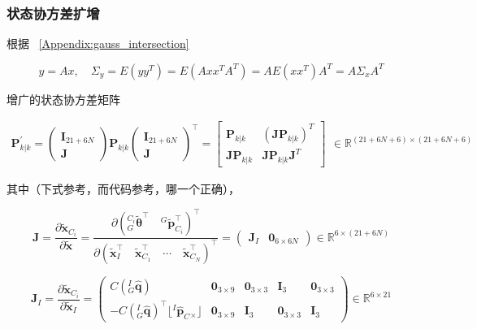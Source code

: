 \documentclass[12pt,a4paper]{article}
\begin{document}
\subsubsection{状态协方差扩增}

根据 ~\ref{Appendix:gauss_intersection}

$$
y = Ax, \quad {\Sigma}_y = E(yy^T) = E(Ax x^T A^T) = A E(xx^T) A^T = A {\Sigma}_x A^T
$$

增广的状态协方差矩阵

\begin{equation}
\begin{aligned}
\mathbf{P}_{k|k}^{\prime}
= 
\begin{pmatrix}
\mathbf{I}_{21+6N} \\ \mathbf{J}
\end{pmatrix}
\mathbf{P}_{k|k}
\begin{pmatrix}
\mathbf{I}_{21+6N} \\ \mathbf{J}
\end{pmatrix}^\top 
=
\begin{bmatrix}
\mathbf{P}_{k|k} & (\mathbf{J} \mathbf{P}_{k|k})^T \\
\mathbf{J} \mathbf{P}_{k|k} & \mathbf{J} \mathbf{P}_{k|k} \mathbf{J}^T
\end{bmatrix}
\end{aligned}
\in \mathbb{R}^{(21+6N+6) \times (21+6N+6)}
\end{equation}

其中（下式参考\citep{sun2018robust}，而代码参考\cite{mourikis2007multi}，{\color{red}哪一个正确}），

\begin{equation*}
\mathbf{J} = 
\frac{\partial{\tilde{\mathbf{x}}_{C_i}}}{\partial{\tilde{\mathbf{x}}}} = 
\frac{
\partial{\left(
{}^{C_i}_G\tilde{\boldsymbol{\theta}}^\top \quad
{}^G\tilde{\mathbf{p}}_{C_i}^\top
\right)^\top}}
{\partial{\left(
\tilde{\mathbf{x}}_I^\top \quad
\tilde{\mathbf{x}}_{C_1}^\top \quad
\cdots \quad 
\tilde{\mathbf{x}}_{C_N}^\top
\right)^\top}} = 
\begin{pmatrix}
\mathbf{J}_I & \mathbf{0}_{6\times 6N}
\end{pmatrix}
\in \mathbb{R}^{6 \times (21+6N)}
\end{equation*}

\begin{equation*}
\mathbf{J}_I = 
\frac{\partial{\tilde{\mathbf{x}}_{C_i}}}{\partial{\tilde{\mathbf{x}}_I}} = 
\begin{pmatrix}
C\left({}^I_G\hat{\mathbf{q}}\right) & \mathbf{0}_{3\times 9} & 
\mathbf{0}_{3\times 3} & \mathbf{I}_3 & \mathbf{0}_{3\times 3} \\
-C\left({}^I_G\hat{\mathbf{q}}\right)^\top \lfloor{}^I\hat{\mathbf{p}}_C {}_{\times}\rfloor & 
\mathbf{0}_{3\times 9} & \mathbf{I}_3 & \mathbf{0}_{3\times 3} & 
\mathbf{I}_{3}
\end{pmatrix}
\in \mathbb{R}^{6 \times 21}
\end{equation*}
\end{document}
